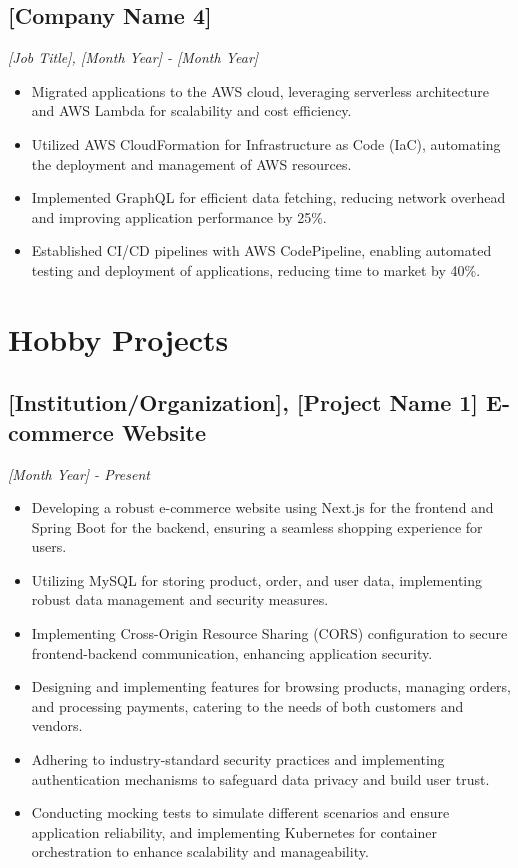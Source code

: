 \documentclass[a4paper,10pt]{article}
\begin{document}
\subsection*{[Company Name 4]}
\textit{[Job Title], [Month Year] - [Month Year]}
\begin{itemize}[noitemsep]
\item Migrated applications to the AWS cloud, leveraging serverless architecture and AWS Lambda for scalability and cost efficiency.
\item Utilized AWS CloudFormation for Infrastructure as Code (IaC), automating the deployment and management of AWS resources.
\item Implemented GraphQL for efficient data fetching, reducing network overhead and improving application performance by 25\%.
\item Established CI/CD pipelines with AWS CodePipeline, enabling automated testing and deployment of applications, reducing time to market by 40\%.
\end{itemize}

\section*{Hobby Projects}
\subsection*{[Institution/Organization], [Project Name 1] E-commerce Website}
\textit{[Month Year] - Present}
\begin{itemize}[noitemsep]
\item Developing a robust e-commerce website using Next.js for the frontend and Spring Boot for the backend, ensuring a seamless shopping experience for users.
\item Utilizing MySQL for storing product, order, and user data, implementing robust data management and security measures.
\item Implementing Cross-Origin Resource Sharing (CORS) configuration to secure frontend-backend communication, enhancing application security.
\item Designing and implementing features for browsing products, managing orders, and processing payments, catering to the needs of both customers and vendors.
\item Adhering to industry-standard security practices and implementing authentication mechanisms to safeguard data privacy and build user trust.
\item Conducting mocking tests to simulate different scenarios and ensure application reliability, and implementing Kubernetes for container orchestration to enhance scalability and manageability.
\end{itemize}
\end{document}
